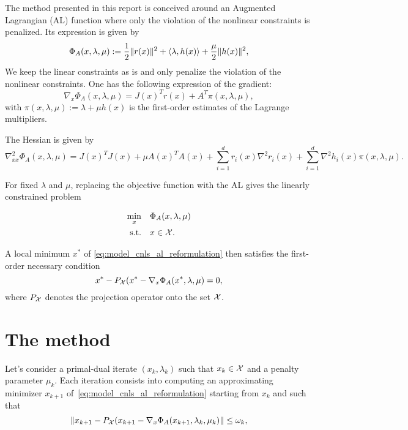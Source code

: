 \documentclass[10pt]{article}
\begin{document}
	The method presented in this report is conceived around an Augmented Lagrangian (AL) function where only the violation of the nonlinear constraints is penalized. Its expression is given by	
	\begin{equation}
		\label{eq:lsal}
		\Phi_A(x,\lambda,\mu) := \dfrac{1}{2}\|r(x)\|^2 + \left\langle {\lambda} , {h(x)} \right\rangle + \dfrac{\mu}{2} \|h(x)\|^2,
	\end{equation}
	We keep the linear constraints as is and only penalize the violation of the nonlinear constraints. 
	One has the following expression of the gradient: 
	\begin{equation}
		\label{eq:al_grad}
		\nabla_x \Phi_A(x,\lambda,\mu) = J(x)^Tr(x) + A^T\pi(x,\lambda,\mu),
	\end{equation}
	with $\pi(x,\lambda,\mu):=\lambda + \mu h(x)$ is the first-order estimates of the Lagrange multipliers. 
	
	The Hessian is given by
	\begin{equation}\label{eq:al_hessian}
		\nabla^2_{xx} \Phi_A(x,\lambda,\mu) = J(x)^TJ(x) + \mu A(x)^TA(x) +  \sum_{i=1}^d r_i(x)\nabla^2r_i(x) + \sum_{i=1}^d \nabla^2 h_i(x) \pi(x,\lambda,\mu).
	\end{equation}
	
	For fixed $\lambda$ and $\mu$, replacing the objective function with the AL gives the linearly constrained problem
	
	\begin{equation}\label{eq:model_cnls_al_reformulation} 
		\begin{aligned}
			\min_{x} \quad& \Phi_A(x,\lambda,\mu)  \\
			\text{s.t.}  \quad & x \in {\mathcal{X}}.
		\end{aligned}	
	\end{equation}
	
	A local minimum $x^*$ of \eqref{eq:model_cnls_al_reformulation} then satisfies the first-order necessary condition
	\[x^*-P_{\mathcal{X}}(x^* -\nabla_x\Phi_A(x^*,\lambda,\mu)=0,\]
	where $P_{\mathcal{X}}$ denotes the projection operator onto the set ${\mathcal{X}}$.
	\section{The method}
	
	Let's consider a primal-dual iterate $(x_k,\lambda_k)$ such that $x_k \in {\mathcal{X}}$ and a penalty parameter $\mu_k$. Each iteration consists into computing an approximating minimizer $x_{k+1}$ of~\eqref{eq:model_cnls_al_reformulation} starting from $x_k$ and such that
	\begin{equation}\label{eq:al_approximate_optimality}
		\left\Vert x_{k+1}-P_{\mathcal{X}}(x_{k+1}-\nabla_x\Phi_A(x_{k+1},\lambda_k,\mu_k)\right\Vert \le \omega_k,
	\end{equation}
	
\end{document}

